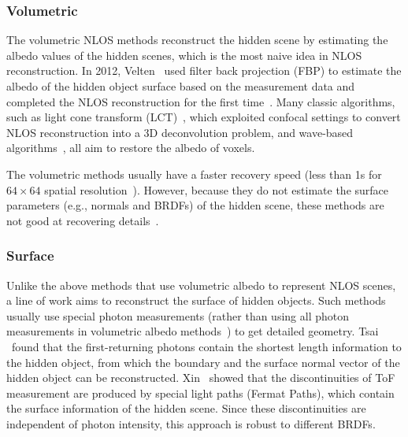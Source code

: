 \subsubsection{Volumetric}
The volumetric NLOS methods reconstruct the hidden scene by estimating the albedo values of the hidden scenes, which is the most naive idea in NLOS reconstruction. In 2012, Velten \etal~used filter back projection (FBP) to estimate the albedo of the hidden object surface based on the measurement data and completed the NLOS reconstruction for the first time~\cite{veltenRecoveringThreedimensionalShape2012}. Many classic algorithms, such as light cone transform (LCT)~\cite{otooleConfocalNonlineofsightImaging2018}, which exploited confocal settings to convert NLOS reconstruction into a 3D deconvolution problem, and wave-based algorithms~\cite{Lindell:2019:Wave,liuPhasorFieldDiffraction2020}, all aim to restore the albedo of voxels.

The volumetric methods usually have a faster recovery speed (less than 1s for $64\times 64$ spatial resolution~\cite{Young:2020:dlct}). However, because they do not estimate the surface parameters (e.g., normals and BRDFs) of the hidden scene, these methods are not good at recovering details~\cite{tsaiVolumetricAlbedoSurface2019,Young:2020:dlct}.


\subsubsection{Surface}
Unlike the above methods that use volumetric albedo to represent NLOS scenes, a line of work aims to reconstruct the surface of hidden objects.
Such methods usually use special photon measurements (rather than using all photon measurements in volumetric albedo methods~\cite{otooleConfocalNonlineofsightImaging2018,veltenRecoveringThreedimensionalShape2012}) to get detailed geometry.
Tsai \etal~found that the first-returning photons contain the shortest length information to the hidden object, from which the boundary and the surface normal vector of the hidden object can be reconstructed\cite{tsaiGeometryFirstreturningPhotons2017}. Xin \etal~showed that the discontinuities of ToF measurement are produced by special light paths (Fermat Paths), which contain the surface information of the hidden scene\cite{xinTheoryFermatPaths2019}. Since these discontinuities are independent of photon intensity, this approach is robust to different BRDFs.

